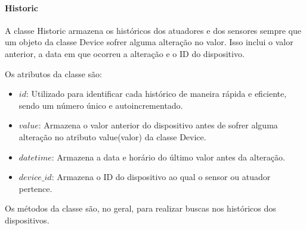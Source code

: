 \documentclass[conference, a4paper, 12pt]{IEEEtran}
\begin{document}
\paragraph{Historic}
A classe Historic armazena os históricos dos atuadores e dos sensores sempre que um objeto da classe Device sofrer alguma alteração no valor. Isso inclui o valor anterior, a data em que ocorreu a alteração e o ID do dispositivo.

Os atributos da classe são:
\begin{itemize}
  \item $id$: Utilizado para identificar cada histórico de maneira rápida e eficiente, sendo um número único e autoincrementado.
  \item $value$: Armazena o valor anterior do dispositivo antes de sofrer alguma alteração no atributo value(valor) da classe Device.
  \item $datetime$: Armazena a data e horário do último valor antes da alteração.
  \item $device\_id$:  Armazena o ID do dispositivo ao qual o sensor ou atuador pertence.
\end{itemize}

Os métodos da classe são, no geral, para realizar buscas nos históricos dos dispositivos.
\end{document}
